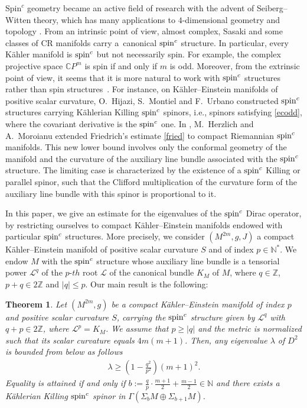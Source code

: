 \documentclass[10pt,a4paper]{amsart}
\numberwithin{equation}{section}
\newtheorem{thm}{Theorem}[section]
\theoremstyle{definition}
\begin{document}
$ \mathrm{Spin}^c$ geometry became an active f\/ield of research with the advent
of Seiberg--Witten theory, which has many applications to $4$-dimensional geometry and topology \cite{don,gursky,lebrun1,lebrun2,SW3, SW2}.
From an intrinsic point of view,
almost complex, Sasaki and some classes of CR manifolds carry a~canonical ${\mathop{\rm spin}^c}$ structure.
In particular, every K\"ahler manifold is ${\mathop{\rm spin}^c}$ but not necessarily spin.
For example, the complex projective space $\mathbb C P^m$ is spin if and only if $m$ is odd. Moreover, from the extrinsic point of view, it seems that it is more natural to work with ${\mathop{\rm spin}^c}$ structures rather than spin structu\-res~\cite{hmu, nakadthesis,JRRN}. For instance, on K\"ahler--Einstein manifolds of positive scalar curvature, O.~Hijazi, S.~Montiel and F.~Urbano \cite{hmu} constructed
${\mathop{\rm spin}^c}$ structures carrying  K\"ahlerian Killing  ${\mathop{\rm spin}^c}$ spinors, i.e., spinors satisfying \eqref{ecodd}, where the covariant derivative is the ${\mathop{\rm spin}^c}$ one. In \cite{her}, M.~Herzlich and A.~Moroianu  extended Friedrich's estimate \eqref{fried} to compact Riemannian ${\mathop{\rm spin}^c}$ manifolds. This new lower bound involves only the conformal geometry of the manifold and the curvature of the auxiliary line bundle associated with the ${\mathop{\rm spin}^c}$ structure. The limiting case is characterized by the existence of a ${\mathop{\rm spin}^c}$ Killing  or parallel spinor, such that the Clif\/ford multiplication of the curvature form of the auxiliary line bundle with this spinor is proportional to it.

In this paper, we give an  estimate for the eigenvalues of the ${\mathop{\rm spin}^c}$ Dirac operator, by restric\-ting ourselves to
compact K\"ahler--Einstein manifolds endowed with particular ${\mathop{\rm spin}^c}$ structures.
More precisely, we consider $(M^{2m},g,J)$  a compact K\"ahler--Einstein manifold of positive scalar curvature $S$ and of index $p\in\mathbb{N}^*$.  We endow $M$ with the ${\mathop{\rm spin}^c}$ structure whose auxiliary line bundle is a tensorial power $\mathcal{L}^q$ of the $p$-$th$ root $\mathcal L$ of the canonical bundle $K_M$ of $M$, where $q \in \mathbb Z$, $p+q\in2\mathbb{Z}$ and $|q|\leq p$. Our main result is the following:


\begin{thm}\label{globestimke}
 Let $(M^{2m}, g)$ be a compact K\"ahler--Einstein manifold of index $p$ and positive scalar curvature $S$, carrying the ${\mathop{\rm spin}^c}$ structure given by $\mathcal{L}^q$ with $q+p\in 2\mathbb{Z}$, where $\mathcal{L}^p=K_M$. We assume that $p \geq |q|$ and the metric is normalized such that its scalar curvature equals $4m(m+1)$.
 Then, any eigenvalue $\lambda$ of $D^2$ is bounded from below as follows
 \begin{gather}\label{global}
\lambda\geq \left(1-\frac{q^2}{p^2}\right) (m+1)^2.
 \end{gather}
Equality is attained if and only if $b:=\frac{q}{p}\cdot\frac{m+1}{2}+\frac{m-1}{2}\in\mathbb{N}$ and there exists a  K\"ahlerian Killing ${\mathop{\rm spin}^c}$ spinor in $\Gamma(\Sigma_{b}M\oplus \Sigma_{b+1} M)$.
\end{thm}
\end{document}
